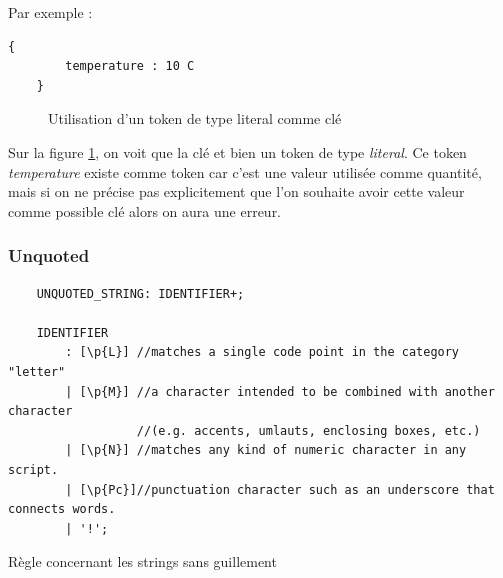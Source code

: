 \documentclass[
    iict, %
    il, %
]{heig-tb}
\begin{document}
Par exemple :

\begin{lstlisting}[frame=single]
    {
        temperature : 10 C
    }
\end{lstlisting}

\begin{figure}[!h]
    \begin{center}
    \end{center}
    \caption[Utilisation d'un token de type literal comme clé]{\label{literal-key-uon}Utilisation d'un token de type literal comme clé}
\end{figure}

Sur la figure \ref{literal-key-uon}, on voit que la clé et bien un token de type \emph{literal}.
Ce token \emph{temperature} existe comme token car c'est une valeur utilisée comme quantité, mais si on ne précise pas explicitement que l'on souhaite avoir cette valeur
comme possible clé alors on aura une erreur.

\subsubsection{Unquoted}

\begin{listing}[H]
    \begin{verbatim}
    UNQUOTED_STRING: IDENTIFIER+;

    IDENTIFIER
        : [\p{L}] //matches a single code point in the category "letter"
        | [\p{M}] //a character intended to be combined with another character
                  //(e.g. accents, umlauts, enclosing boxes, etc.)
        | [\p{N}] //matches any kind of numeric character in any script.
        | [\p{Pc}]//punctuation character such as an underscore that connects words.
        | '!';
    \end{verbatim}
    \caption{Règle concernant les strings sans guillement}
    \label{unquoted-rule}
\end{listing}
\end{document}
